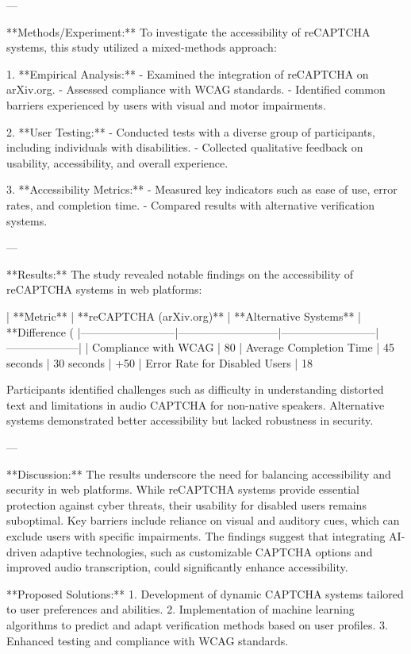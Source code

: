 ---

**Methods/Experiment:**  
To investigate the accessibility of reCAPTCHA systems, this study utilized a mixed-methods approach:

1. **Empirical Analysis:**  
   - Examined the integration of reCAPTCHA on arXiv.org.
   - Assessed compliance with WCAG standards.
   - Identified common barriers experienced by users with visual and motor impairments.

2. **User Testing:**  
   - Conducted tests with a diverse group of participants, including individuals with disabilities.
   - Collected qualitative feedback on usability, accessibility, and overall experience.

3. **Accessibility Metrics:**  
   - Measured key indicators such as ease of use, error rates, and completion time.
   - Compared results with alternative verification systems.

---

**Results:**  
The study revealed notable findings on the accessibility of reCAPTCHA systems in web platforms:

| **Metric**               | **reCAPTCHA (arXiv.org)** | **Alternative Systems** | **Difference (%
|--------------------------|---------------------------|--------------------------|--------------------|
| Compliance with WCAG     | 80%
| Average Completion Time  | 45 seconds               | 30 seconds              | +50%
| Error Rate for Disabled Users | 18%

Participants identified challenges such as difficulty in understanding distorted text and limitations in audio CAPTCHA for non-native speakers. Alternative systems demonstrated better accessibility but lacked robustness in security.

---

**Discussion:**  
The results underscore the need for balancing accessibility and security in web platforms. While reCAPTCHA systems provide essential protection against cyber threats, their usability for disabled users remains suboptimal. Key barriers include reliance on visual and auditory cues, which can exclude users with specific impairments. The findings suggest that integrating AI-driven adaptive technologies, such as customizable CAPTCHA options and improved audio transcription, could significantly enhance accessibility.

**Proposed Solutions:**  
1. Development of dynamic CAPTCHA systems tailored to user preferences and abilities.
2. Implementation of machine learning algorithms to predict and adapt verification methods based on user profiles.
3. Enhanced testing and compliance with WCAG standards.

